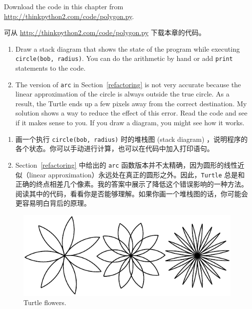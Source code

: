 \begin{exercise}

Download the code in this chapter from
\url{http://thinkpython2.com/code/polygon.py}.

可从 \href{http://thinkpython2.com/code/polygon.py}{http://thinkpython2.com/code/polygon.py} 下载本章的代码。

\begin{enumerate}

\item Draw a stack diagram that shows the state of the program
while executing {\tt circle(bob, radius)}.  You can do the
arithmetic by hand or add {\tt print} statements to the code.

\item The version of {\tt arc} in Section~\ref{refactoring} is not
very accurate because the linear approximation of the
circle is always outside the true circle.  As a result,
the Turtle ends up a few pixels away from the correct
destination.  My solution shows a way to reduce
the effect of this error.  Read the code and see if it makes
sense to you.  If you draw a diagram, you might see how it works.

\end{enumerate}

\begin{enumerate}

\item 画一个执行 \lstinline{circle(bob, radius)} 时的堆栈图 (stack diagram) ，说明程序的各个状态。你可以手动进行计算，也可以在代码中加入打印语句。

\item Section~\ref{refactoring} 中给出的 \lstinline{arc} 函数版本并不太精确，因为圆形的线性近似（linear approximation）永远处在真正的圆形之外。因此，\lstinline{Turtle} 总是和正确的终点相差几个像素。我的答案中展示了降低这个错误影响的一种方法。阅读其中的代码，看看你是否能够理解。如果你画一个堆栈图的话，你可能会更容易明白背后的原理。

\end{enumerate}

\end{exercise}


\begin{figure}
\centerline
{\includegraphics[scale=0.8]{../source/figs/flowers.pdf}}
\caption{Turtle flowers.}
\label{fig.flowers}
\end{figure}

